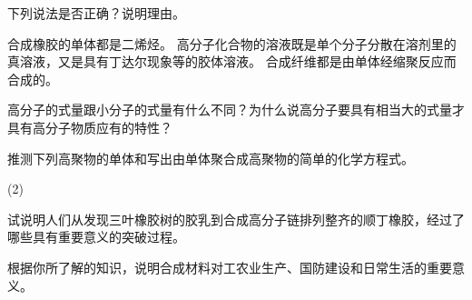\begin{Review}
\begin{question}
  \item 下列说法是否正确？说明理由。
  \begin{tasks}[label=(\arabic*)]
    \task 合成橡胶的单体都是二烯烃。
    \task 高分子化合物的溶液既是单个分子分散在溶剂里的真溶液，又是具有丁达尔现象等的胶体溶液。
    \task 合成纤维都是由单体经缩聚反应而合成的。
  \end{tasks}
  \item 高分子的式量跟小分子的式量有什么不同？为什么说高分子要具有相当大的式量才具有高分子物质应有的特性？
  \item 推测下列高聚物的单体和写出由单体聚合成高聚物的简单的化学方程式。
  \begin{tasks}[before-skip=10pt,after-skip=10pt,after-item-skip=7pt](2)
    \task {}
    \task {}
    \task {}
  \end{tasks}
  \item 试说明人们从发现三叶橡胶树的胶乳到合成高分子链排列整齐的顺丁橡胶，经过了哪些具有重要意义的突破过程。
  \item 根据你所了解的知识，说明合成材料对工农业生产、国防建设和日常生活的重要意义。
\end{question}
\end{Review}

